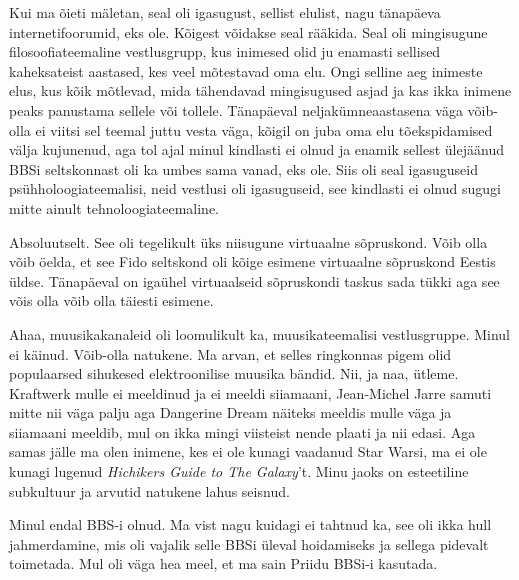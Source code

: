 Kui ma õieti mäletan, seal oli igasugust, sellist elulist, nagu tänapäeva 
internetifoorumid, eks ole. Kõigest võidakse seal rääkida. Seal oli mingisugune 
filosoofiateemaline  vestlusgrupp, kus  inimesed olid ju enamasti sellised 
kaheksateist aastased, kes veel mõtestavad oma elu. Ongi selline aeg inimeste 
elus, kus kõik mõtlevad, mida tähendavad mingisugused asjad ja kas ikka inimene 
peaks panustama sellele või tollele. Tänapäeval neljakümneaastasena väga 
võib-olla ei viitsi sel teemal juttu vesta väga, kõigil on juba oma elu 
tõekspidamised välja kujunenud, aga tol ajal minul kindlasti ei olnud ja enamik 
sellest ülejäänud BBSi seltskonnast oli ka umbes sama vanad, eks ole. Siis oli 
seal igasuguseid psühholoogiateemalisi, neid vestlusi oli igasuguseid, see 
kindlasti ei olnud sugugi mitte ainult tehnoloogiateemaline. 


Absoluutselt. See oli tegelikult üks niisugune virtuaalne sõpruskond.  Võib 
olla võib öelda, et see Fido seltskond oli kõige esimene virtuaalne sõpruskond 
Eestis üldse. Tänapäeval on  igaühel virtuaalseid sõpruskondi taskus sada tükki 
aga see võis olla võib olla täiesti esimene.


Ahaa, muusikakanaleid oli loomulikult ka, muusikateemalisi  vestlusgruppe. 
Minul ei käinud. Võib-olla natukene. Ma arvan, et  selles ringkonnas pigem olid 
populaarsed sihukesed elektroonilise muusika bändid. Nii, ja naa, ütleme. 
Kraftwerk mulle ei meeldinud ja ei meeldi siiamaani, Jean-Michel Jarre samuti 
mitte nii väga palju aga Dangerine Dream näiteks meeldis mulle väga ja 
siiamaani meeldib, mul on ikka mingi viisteist nende plaati ja nii edasi. Aga 
samas jälle ma olen inimene, kes ei ole kunagi vaadanud Star Warsi, ma ei ole 
kunagi lugenud \emph{Hichikers Guide to The Galaxy}'t. Minu jaoks  on 
esteetiline subkultuur ja arvutid natukene lahus seisnud.


Minul endal BBS-i olnud. Ma vist nagu kuidagi ei tahtnud ka, see oli ikka hull 
jahmerdamine, mis oli vajalik selle BBSi üleval hoidamiseks ja sellega pidevalt 
toimetada. Mul oli väga hea meel, et ma sain  Priidu BBSi-i kasutada.

